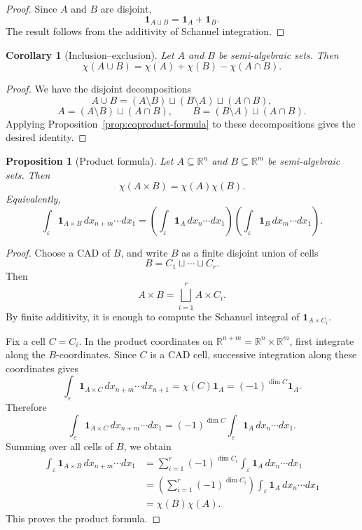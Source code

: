 \documentclass[11pt]{article}
\newtheorem{proposition}[theorem]{Proposition}
\newtheorem{corollary}[theorem]{Corollary}
\theoremstyle{remark}
\newcommand{\1}{\mathbf 1}
\begin{document}
\begin{proof}
Since \(A\) and \(B\) are disjoint,
\[
  \mathbf{1}_{A\sqcup B}
  =
  \mathbf{1}_A+\mathbf{1}_B .
\]
The result follows from the additivity of Schanuel integration.
\end{proof}

\begin{corollary}[Inclusion--exclusion]
\label{cor:inclusion-exclusion}
Let \(A\) and \(B\) be semi-algebraic sets.  Then
\[
  \chi(A\cup B)
  =
  \chi(A)+\chi(B)-\chi(A\cap B).
\]
\end{corollary}

\begin{proof}
We have the disjoint decompositions
\[
  A\cup B
  =
  (A\setminus B)\sqcup (B\setminus A)\sqcup (A\cap B),
\]
\[
  A
  =
  (A\setminus B)\sqcup (A\cap B),
  \qquad
  B
  =
  (B\setminus A)\sqcup (A\cap B).
\]
Applying Proposition~\ref{prop:coproduct-formula} to these decompositions gives
the desired identity.
\end{proof}

\begin{proposition}[Product formula]
\label{prop:product-formula}
Let \(A\subseteq \mathbb{R}^n\) and
\(B\subseteq \mathbb{R}^m\) be semi-algebraic sets.  Then
\[
  \chi(A\times B)=\chi(A)\chi(B).
\]
Equivalently,
\[
  \int_{\varepsilon}\mathbf{1}_{A\times B}\,
  dx_{n+m}\cdots dx_1
  =
  \left(
    \int_{\varepsilon}\mathbf{1}_A\,dx_n\cdots dx_1
  \right)
  \left(
    \int_{\varepsilon}\mathbf{1}_B\,dx_m\cdots dx_1
  \right).
\]
\end{proposition}

\begin{proof}
Choose a CAD of \(B\), and write \(B\) as a finite disjoint union of cells
\[
  B=C_1\sqcup\cdots\sqcup C_r.
\]
Then
\[
  A\times B
  =
  \bigsqcup_{i=1}^r A\times C_i.
\]
By finite additivity, it is enough to compute the Schanuel integral of
\(\mathbf{1}_{A\times C_i}\).

Fix a cell \(C=C_i\).  In the product coordinates on
\(\mathbb{R}^{n+m}=\mathbb{R}^n\times\mathbb{R}^m\), first integrate along the
\(B\)-coordinates.  Since \(C\) is a CAD cell, successive integration along
these coordinates gives
\[
  \int_{\varepsilon}\mathbf{1}_{A\times C}\,
  dx_{n+m}\cdots dx_{n+1}
  =
  \chi(C)\mathbf{1}_A
  =
  (-1)^{\dim C}\mathbf{1}_A .
\]
Therefore
\[
  \int_{\varepsilon}\mathbf{1}_{A\times C}\,
  dx_{n+m}\cdots dx_1
  =
  (-1)^{\dim C}
  \int_{\varepsilon}\mathbf{1}_A\,dx_n\cdots dx_1 .
\]
Summing over all cells of \(B\), we obtain
\[
\begin{aligned}
  \int_{\varepsilon}\mathbf{1}_{A\times B}\,
  dx_{n+m}\cdots dx_1
  &=
  \sum_{i=1}^r
  (-1)^{\dim C_i}
  \int_{\varepsilon}\mathbf{1}_A\,dx_n\cdots dx_1        \\
  &=
  \left(\sum_{i=1}^r (-1)^{\dim C_i}\right)
  \int_{\varepsilon}\mathbf{1}_A\,dx_n\cdots dx_1        \\
  &=
  \chi(B)\chi(A).
\end{aligned}
\]
This proves the product formula.
\end{proof}
\end{document}

